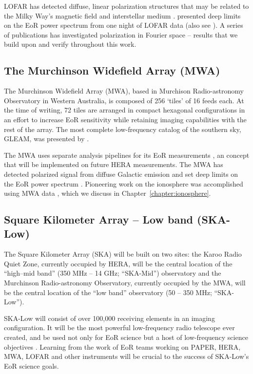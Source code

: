 LOFAR has detected diffuse, linear polarization structures that may be related to the Milky Way's magnetic field and interstellar medium \citep{Jelic.15}. \cite{Patil.17} presented deep limits on the EoR power spectrum from one night of LOFAR data (also see \citet{Yatawatta.13}). A series of publications has investigated polarization in Fourier space \citep{Jelic.14, Asad.15, Asad.16, Asad.17} -- results that we build upon and verify throughout this work.

\subsection{The Murchinson Widefield Array (MWA)}
\label{subsec:mwa_instrument}

The Murchinson Widefield Array (MWA), based in Murchison Radio-astronomy Observatory in Western Australia, is composed of 256 `tiles' of 16 feeds each. At the time of writing, 72 tiles are arranged in compact hexagonal configurations in an effort to increase EoR sensitivity while retaining imaging capabilities with the rest of the array. The most complete low-frequency catalog of the southern sky, GLEAM, was presented by \cite{Hurley-Walker.17}.

The MWA uses separate analysis pipelines for its EoR measurements \citep{Sullivan.12, Jacobs.16, Trott.16}, an concept that will be implemented on future HERA measurements. The MWA has detected polarized signal from diffuse Galactic emission \citep{Lenc.16, Lenc.17} and set deep limits on the EoR power spectrum \citep[e.g.][]{Dillon.14, Dillon.15}. Pioneering work on the ionosphere was accomplished using MWA data \citep[e.g.][]{Loi.15}, which we discuss in Chapter~\ref{chapter:ionosphere}.

\subsection{Square Kilometer Array -- Low band (SKA-Low)}
\label{subsec:skalow_instrument}

The Square Kilometer Array (SKA) will be built on two sites: the Karoo Radio Quiet Zone, currently occupied by HERA, will be the central location of the ``high--mid band'' (350 MHz -- 14 GHz; ``SKA-Mid'') observatory and the Murchinson Radio-astronomy Observatory, currently occupied by the MWA, will be the central location of the ``low band'' observatory (50 -- 350 MHz; ``SKA-Low'').

SKA-Low will consist of over 100,000 receiving elements in an imaging configuration. It will be the most powerful low-frequency radio telescope ever created, and be used not only for EoR science but a host of low-frequency science objectives \citep[e.g.][]{SKABook, Schilizzi.07, Dewdney.09}. Learning from the work of EoR teams working on PAPER, HERA, MWA, LOFAR and other instruments will be crucial to the success of SKA-Low's EoR science goals.

